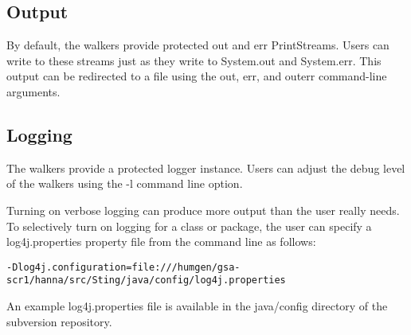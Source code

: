 \documentclass[11pt,fullpage]{article}
\begin{document}
\subsection{Output}
By default, the walkers provide protected out and err PrintStreams.
Users can write to these streams just as they write to System.out and
System.err.  This output can be redirected to a file using the out,
err, and outerr command-line arguments.

\subsection{Logging}
The walkers provide a protected logger instance.  Users can adjust the
debug level of the walkers using the -l command line option.

Turning on verbose logging can produce more output than the user
really needs.  To selectively turn on logging for a class or package,
the user can specify a log4j.properties property file from the command
line as follows:

\begin{verbatim}
-Dlog4j.configuration=file:///humgen/gsa-scr1/hanna/src/Sting/java/config/log4j.properties
\end{verbatim}

An example log4j.properties file is available in the java/config
directory of the subversion repository.
\end{document}
